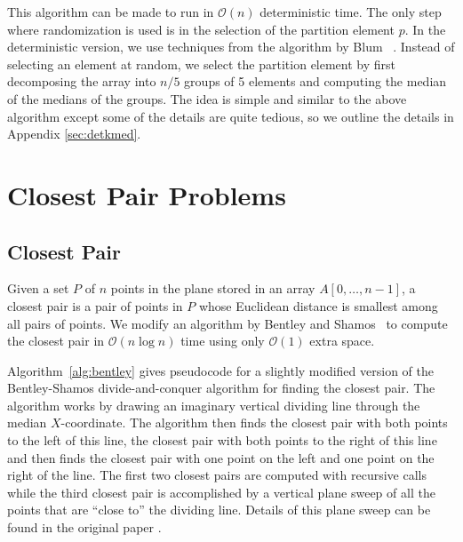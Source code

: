 \documentclass{elsart}
\newcommand{\Oh}[1]{\ensuremath{\mathcal{O}(#1)}}
\begin{document}
This algorithm can be made to run in \Oh{n} deterministic time. The
only step where randomization is used is in the selection of the
partition element $p$. In the deterministic version, we use techniques
from the algorithm by Blum \etal~\cite{blum:selection}.  Instead of
selecting an element at random, we select the partition element by
first decomposing the array into $n/5$ groups of 5 elements and
computing the median of the medians of the groups.  The idea is simple
and similar to the above algorithm except some of the details are
quite tedious, so we outline the details in Appendix
\ref{sec:detkmed}.

\section{Closest Pair Problems}\label{sec:nn}

\subsection{Closest Pair}

Given a set $P$ of $n$ points in the plane stored in an array
$A[0,\ldots,n - 1]$, a closest pair is a pair of points in
$P$ whose Euclidean distance is smallest among all pairs of points. We
modify an algorithm by Bentley and
Shamos~\cite{bentley:divide-and-conquer} to compute the closest pair
in \Oh{n \log n} time using only \Oh{1} extra space.

Algorithm~\ref{alg:bentley} gives pseudocode for a slightly modified
version of the Bentley-Shamos divide-and-conquer algorithm for finding
the closest pair.  The algorithm works by drawing an imaginary
vertical dividing line through the median $X$-coordinate.  The
algorithm then finds the closest pair with both points to the left of
this line, the closest pair with both points to the right of this line
and then finds the closest pair with one point on the left and one
point on the right of the line.  The first two closest pairs are
computed with recursive calls while the third closest pair is
accomplished by a vertical plane sweep of all the points that are
``close to'' the dividing line.  Details of this plane sweep can be
found in the original paper \cite{bentley:divide-and-conquer}.
 
\end{document}
